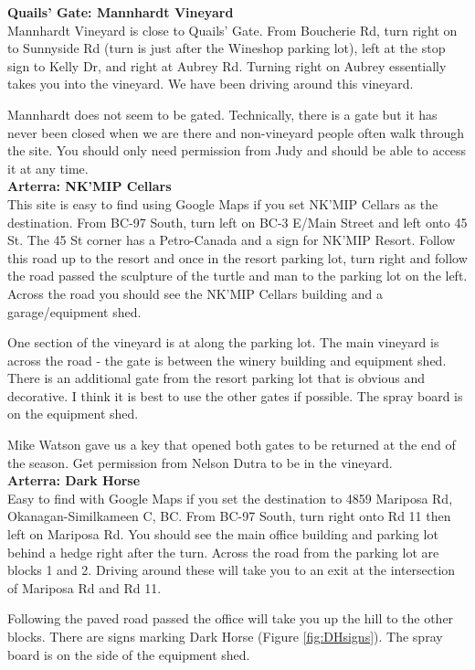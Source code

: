 \documentclass[11pt,letter]{article}
\begin{document}
{\bf Quails' Gate: Mannhardt Vineyard} \\
Mannhardt Vineyard is close to Quails' Gate. From Boucherie Rd, turn right on to Sunnyside Rd (turn is just after the Wineshop parking lot), left at the stop sign to Kelly Dr, and right at Aubrey Rd. Turning right on Aubrey essentially takes you into the vineyard. We have been driving around this vineyard.

Mannhardt does not seem to be gated. Technically, there is a gate but it has never been closed when we are there and non-vineyard people often walk through the site. You should only need permission from Judy and should be able to access it at any time. \\

{\bf Arterra: NK'MIP Cellars} \\
This site is easy to find using Google Maps if you set NK'MIP Cellars as the destination.
From BC-97 South, turn left on BC-3 E/Main Street and left onto 45 St. The 45 St corner has a Petro-Canada and a sign for NK'MIP Resort. Follow this road up to the resort and once in the resort parking lot, turn right and follow the road passed the sculpture of the turtle and man to the parking lot on the left. Across the road you should see the NK'MIP Cellars building and a garage/equipment shed. 

One section of the vineyard is at along the parking lot. The main vineyard is across the road - the gate is between the winery building and equipment shed. There is an additional gate from the resort parking lot that is obvious and decorative. I think it is best to use the other gates if possible. The spray board is on the equipment shed.

Mike Watson gave us a key that opened both gates to be returned at the end of the season. Get permission from Nelson Dutra to be in the vineyard. \\

{\bf Arterra: Dark Horse} \\
Easy to find with Google Maps if you set the destination to 4859 Mariposa Rd, Okanagan-Similkameen C, BC.
From BC-97 South, turn right onto Rd 11 then left on Mariposa Rd. You should see the main office building and parking lot behind a hedge right after the turn. Across the road from the parking lot are blocks 1 and 2. Driving around these will take you to an exit at the intersection of Mariposa Rd and Rd 11.

Following the paved road passed the office will take you up the hill to the other blocks. There are signs marking Dark Horse (Figure  \ref{fig:DHsigns}). The spray board is on the side of the equipment shed.
\end{document}
